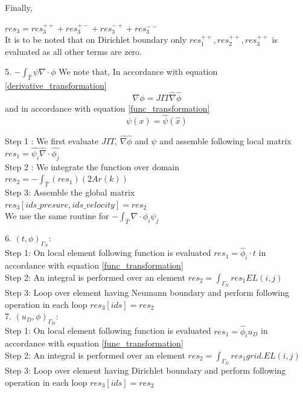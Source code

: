 \documentclass[a4paper]{book}
\begin{document}
Finally,

$res_3 = res_3^{++} + res_3^{+-} + res_3^{-+} + res_3^{--}$\\

It is to be noted that on Dirichlet boundary only $res_1^{++}, res_2^{++}, res_3^{++}$ is evaluated as all other terms are zero.

5. $-\int_{\hat{T}} \psi \nabla \cdot \phi$
We note that, In accordance with equation \ref{derivative_transformation}
\begin{equation}
\nabla \phi = JIT \hat{\nabla} \hat{\phi}
\end{equation}
and in accordance with equation \ref{func_transformation}
\begin{equation}
\psi(x) = \hat{\psi} (\hat{x})
\end{equation}

Step 1 : We first evaluate $JIT$, $\hat{\nabla} \hat{\phi}$ and $\psi$ and assemble following local matrix\\
$res_1 = \hat{\psi_i} \hat{\nabla} \cdot \hat{\phi_j}$\\

Step 2 : We integrate the function over domain\\
$res_2 = -\int_{\hat{T}} (res_1) (2 Ar(k))$\\

Step 3: Assemble the global matrix\\
$res_3[ids\_presure,ids\_velocity] = res_2$\\

We use the same routine for $-\int_{\hat{T}} \nabla \cdot \phi_i \psi_j $

6. $(t,\phi)_{\Gamma_N}$:
\\

Step 1: On local element following function is evaluated $res_1=\hat{\phi}_i \cdot t$ in accordance with equation  \ref{func_transformation}\\
Step 2: An integral is performed over an element $res_2=\int_{\Gamma_N} res_1 EL(i,j) $\\
Step 3: Loop over element having Neumann boundary and perform following operation in each loop $res_3[ids]=res_2$\\

7. $(u_D,\phi)_{\Gamma_D}$:
\\
Step 1: On local element following function is evaluated $res_1=\hat{\phi}_i u_D$ in accordance with equation \ref{func_transformation}\\
Step 2: An integral is performed over an element $res_2=\int_{\Gamma_D} res_1 grid.EL(i,j) $\\
Step 3: Loop over element having Dirichlet boundary and perform following operation in each loop $res_3[ids]=res_2$\\
\end{document}
